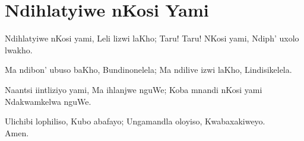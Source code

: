 \starttocol
\chapter{Ndihlatyiwe nKosi Yami}
\nexttocol
\hfill{\it }
\stoptocol
\starttocol
\startlines
{\sc Ndihlatyiwe} nKosi yami,
Leli lizwi laKho;
Taru! Taru! NKosi yami,
Ndiph' uxolo lwakho.

Ma ndibon' ubuso baKho,
Bundinonelela;
Ma ndilive izwi laKho,
Lindisikelela.

Naantsi iintliziyo yami,
Ma ihlanjwe nguWe;
Koba mnandi nKosi yami
Ndakwamkelwa nguWe.
 
Ulichibi lophiliso,
Kubo abafayo; 
Ungamandla oloyiso,
Kwabaxakiweyo. 
          \hfill Amen.~~~~~~~~~

\stoplines
\nexttocol

\stoptocol
